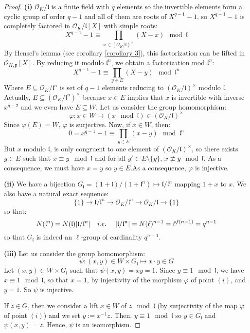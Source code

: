\documentclass[a4paper,10pt]{report}
\theoremstyle{definition}
\theoremstyle{plain}
\theoremstyle{definition}
\newcommand{\ie}{\emph{i.e.}\ }
\newcommand{\mO}{\mathcal{O}}
\renewcommand{\(}{\left(}
\renewcommand{\)}{\right)}
\newcommand{\mf}[1]{\mathfrak{#1}}
\begin{document}
\begin{proof}
\textbf{(i)} $\mO_K/\mf{l}$ is a finite field with $q$ elements so the invertible elements form a cyclic group of order $q-1$ and all of them are roots of $X^{q-1}-1$, so $X^{q-1}-1$ is completely factored in $\mO_K/\mf{l}[X]$ with simple roots:
\[X^{q-1}-1\equiv \prod_{x\in(\mO_K/\mf{l})^\times}(X-x) \mod \mf{l}\]
By Hensel's lemma (see corollary \ref{corollary 3}), this factorization can be lifted in $\mO_{K,\mf{p}}[X]$. By reducing it modulo $\mf{l}^n$, we obtain a factorization mod $\mf{l}^n$:
\[X^{q-1}-1\equiv \prod_{y\in E}(X-y) \mod \mf{l}^n\] 
Where $E\subseteq \mO_K/\mf{l}^n$ is set of $q-1$ elements reducing to $(\mO_K/\mf{l})^\times$ modulo $\mf{l}$. Actually, $E\subseteq (\mO_K/\mf{l}^n)^\times$ because $x\in E$ implies that $x$ is invertible with inverse $x^{q-2}$ and we even have $E\subseteq W$. Let us consider the group homomorphism:
\[\varphi: x\in W\longmapsto (x \mod \mf{l})\in(\mO_K/\mf{l})^\times\]
Since $\varphi(E)=W$, $\varphi$ is surjective.  Now, if $x\in W$, then:
\[0=x^{q-1}-1\equiv \prod_{y\in E}(x-y) \mod \mf{l}^n\]
But $x$ modulo $\mf{l}$, is only congruent to one element of $(\mO_K/\mf{l})^\times$, so there exists $y\in E$ such that $x\equiv y \mod \mf{l}$ and for all $y'\in E\setminus\{y\}$,  $x\not\equiv y \mod \mf{l}$. As a consequence, we must have $x=y$ so $y\in E$.As a consequence, $\varphi$ is injective.

\textbf{(ii)} We have a bijection $G_{\mf{l}}=(1+\mf{l})/(1+\mf{l}^n)\longmapsto \mf{l}/\mf{l}^n$ mapping $1+x$ to $x$. We also have a natural exact sequence:
\[\{1\}\longrightarrow \mf{l}/\mf{l}^n\longrightarrow \mO_K/\mf{l}^n\longrightarrow\mO_K/\mf{l}\longrightarrow\{1\}\]
so that:
\[N(\mf{l}^n)=N(\mf{l})|\mf{l}/\mf{l}^n| \quad \mbox{\ie} \quad |\mf{l}/\mf{l}^n|=N(\ell)^{n-1}=\ell^{f(n-1)}=q^{n-1}\]
so that $G_{\mf{l}}$ is indeed an $\ell$-group of cardinality $q^{n-1}$.

\textbf{(iii)} Let us consider the group homomorphism:
\[\psi: (x,y)\in W\times G_{\mf{l}}\longmapsto x\cdot y\in G\]
Let $(x,y)\in W\times G_{\mf{l}}$ such that $\psi(x,y)=xy=1$. Since $y\equiv 1 \mod \mf{l}$, we have $x\equiv 1 \mod \mf{l}$, so that $x=1$, by injectivity of the morphism $\varphi$ of point $(i)$, and $y=1$. So $\psi$ is injective. 

If $z\in G$, then we consider a lift $x\in W$ of $z \mod \mf{l}$ (by surjectivity of the map $\varphi$ of point $(i)$) and we set $y:=x^{-1}z$. Then, $y\equiv 1 \mod \mf{l}$ so $y\in G_{\mf{l}}$ and $\psi(x,y)=z$. Hence, $\psi$ is an isomorphism.
 
\end{proof}
\end{document}
